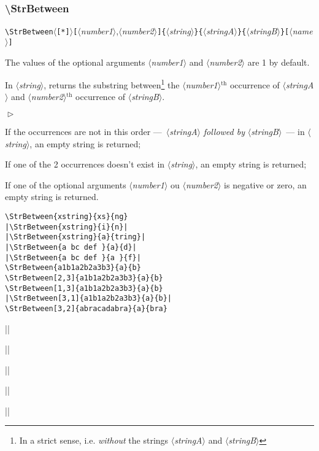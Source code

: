\documentclass[a4paper,10pt]{article}
\newcommand\argu[1]{$\langle$\textit{#1}$\rangle$}
\newcommand\ARGU[1]{\texttt{\{}\argu{#1}\texttt{\}}}
\newcommand\arguC[1]{\texttt{[}\argu{#1}\texttt{]}}
\newcommand\arguCC[2]{\texttt{[}\argu{#1}{,}\argu{#2}\texttt{]}}
\newcommand\etoile{$\langle$\texttt{[*]}$\rangle$}
\newenvironment{Conditions}[1][1cm]%
{\begin{list}%
	{$\vartriangleright$}%
	{\setlength{\leftmargin}{#1}
	 \setlength{\itemsep}{0pt}
	 \setlength{\parsep}{0pt}
	 \setlength{\topsep}{2ptplus3ptminus2pt}
	}}%
{\end{list}}
\renewcommand\th{${}^\text{th}$\xspace}
\newcommand\styleexemple{\small\vskip4pt}
\newcommand\verbinline{\lstinline[basicstyle=\normalsize\ttfamily]}
\begin{document}
\subsubsection{\ttfamily\textbackslash StrBetween}

\verbinline|\StrBetween|\etoile\arguCC{number1}{number2}\ARGU{string}\ARGU{stringA}\ARGU{stringB}\arguC{name}
\smallskip

The values of the optional arguments \argu{number1} and \argu{number2} are 1 by default.\par\smallskip

In \argu{string}, returns the substring between\footnote{In a strict sense, i.e. \emph{without} the strings \argu{stringA} and \argu{stringB}} the \argu{number1}\th occurrence of \argu{stringA} and \argu{number2}\th occurrence of \argu{stringB}.\medskip

\begin{Conditions}
\item If the occurrences are not in this order ---~\argu{stringA} \emph{followed by} \argu{stringB}~--- in \argu{string}, an empty string is returned;
\item If one of the 2 occurrences doesn't exist in \argu{string}, an empty string is returned;
\item  If one of the optional arguments \argu{number1} ou \argu{number2} is negative or zero, an empty string is returned.
\end{Conditions}

\begin{minipage}[t]{0.65\linewidth}
\begin{lstlisting}
\StrBetween{xstring}{xs}{ng}
|\StrBetween{xstring}{i}{n}|
|\StrBetween{xstring}{a}{tring}|
|\StrBetween{a bc def }{a}{d}|
|\StrBetween{a bc def }{a }{f}|
\StrBetween{a1b1a2b2a3b3}{a}{b}
\StrBetween[2,3]{a1b1a2b2a3b3}{a}{b}
\StrBetween[1,3]{a1b1a2b2a3b3}{a}{b}
|\StrBetween[3,1]{a1b1a2b2a3b3}{a}{b}|
\StrBetween[3,2]{abracadabra}{a}{bra}
\end{lstlisting}%
\end{minipage}\hfill
\begin{minipage}[t]{0.35\linewidth}
	\styleexemple
	\par
	||\par
	||\par
	||\par
	||\par
	\par
	\par
	\par
	||\par
	\par
\end{minipage}%
\end{document}
